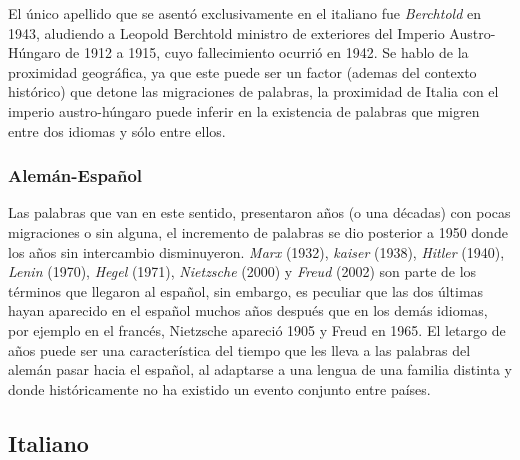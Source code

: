El único apellido que se asentó exclusivamente en el  italiano fue \textit{Berchtold} en 1943, aludiendo a Leopold Berchtold ministro de exteriores del Imperio Austro-Húngaro de 1912 a 1915, cuyo fallecimiento ocurrió en 1942.  Se hablo de la proximidad geográfica, ya que este puede ser un factor (ademas del contexto histórico) que detone las migraciones de palabras, la proximidad de Italia con el imperio austro-húngaro puede inferir en la existencia de  palabras que migren entre  dos idiomas y sólo entre ellos. 

  
\subsubsection*{Alemán-Español}%

Las palabras que van en este sentido,  presentaron años (o una décadas)  con pocas migraciones o sin alguna, el incremento de palabras se dio posterior a 1950 donde los años sin intercambio disminuyeron.  \textit{Marx} (1932), \textit{kaiser} (1938), \textit{Hitler} (1940), \textit{Lenin} (1970), \textit{Hegel} (1971),  \textit{Nietzsche} (2000) y \textit{Freud} (2002) son parte de los términos que llegaron al español,  sin embargo, es peculiar que las dos últimas hayan aparecido en el español muchos años después que en los demás idiomas, por ejemplo en el francés,  Nietzsche apareció 1905 y Freud en 1965. El letargo de años puede ser una característica del tiempo que les lleva  a las  palabras del alemán pasar hacia el español, al adaptarse a una lengua de una familia distinta y donde históricamente no ha existido un evento conjunto entre países. 



\subsection{Italiano}%

